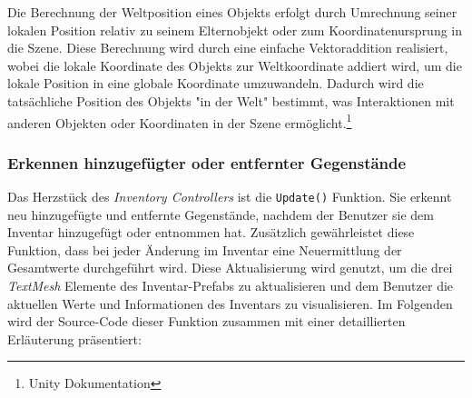 Die Berechnung der Weltposition eines Objekts erfolgt durch Umrechnung seiner lokalen Position relativ zu seinem Elternobjekt
oder zum Koordinatenursprung in die Szene. Diese Berechnung wird durch eine einfache Vektoraddition realisiert, wobei
die lokale Koordinate des Objekts zur Weltkoordinate addiert wird, um die lokale Position in eine globale Koordinate
umzuwandeln. Dadurch wird die tatsächliche Position des Objekts "in der Welt" bestimmt, was Interaktionen mit anderen
Objekten oder Koordinaten in der Szene ermöglicht.\footnote{Unity Dokumentation\cite{Lokal- und Weltposition}}

\subsubsection{Erkennen hinzugefügter oder entfernter Gegenstände}
Das Herzstück des \textit{Inventory Controllers} ist die \texttt{Update()} Funktion. Sie erkennt neu hinzugefügte und
entfernte Gegenstände, nachdem der Benutzer sie dem Inventar hinzugefügt oder entnommen hat. Zusätzlich gewährleistet
diese Funktion, dass bei jeder Änderung im Inventar eine Neuermittlung der Gesamtwerte durchgeführt wird. Diese Aktualisierung
wird genutzt, um die drei \textit{TextMesh} Elemente des Inventar-Prefabs zu aktualisieren und dem Benutzer die aktuellen
Werte und Informationen des Inventars zu visualisieren. Im Folgenden wird der Source-Code dieser Funktion zusammen mit
einer detaillierten Erläuterung präsentiert:
